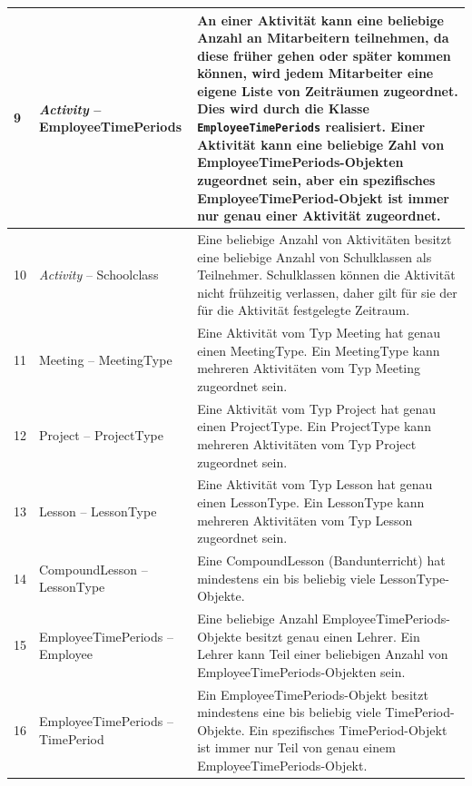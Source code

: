 \documentclass[fontsize=12pt,paper=a4,twoside]{scrartcl}
\begin{document}
\begin{tabularx}{\textwidth}{|p{0.6cm}|p{5cm}|X|}
\hline
9 	& \textit{Activity} -- EmployeeTimePeriods		& An einer Aktivität kann eine beliebige
	Anzahl an Mitarbeitern teilnehmen, da diese früher gehen oder später kommen können, wird jedem Mitarbeiter eine eigene Liste von Zeiträumen zugeordnet. Dies wird durch die Klasse \texttt{EmployeeTimePeriods} realisiert. Einer Aktivität kann eine beliebige Zahl von EmployeeTimePeriods-Objekten zugeordnet sein, aber ein spezifisches EmployeeTimePeriod-Objekt ist immer nur genau einer Aktivität zugeordnet. \\\hline
10	& \textit{Activity} -- Schoolclass				& Eine beliebige Anzahl von Aktivitäten
	besitzt eine beliebige Anzahl von Schulklassen als Teilnehmer. Schulklassen können die Aktivität nicht
	frühzeitig verlassen, daher gilt für sie der für die Aktivität festgelegte Zeitraum.\\\hline
11	& Meeting -- MeetingType 			 & Eine Aktivität vom Typ Meeting hat genau einen
	MeetingType. Ein MeetingType kann mehreren Aktivitäten vom Typ Meeting zugeordnet sein. \\\hline
12	& Project -- ProjectType			& Eine Aktivität vom Typ Project hat genau einen
	ProjectType. Ein ProjectType kann mehreren Aktivitäten vom Typ Project zugeordnet sein. \\\hline
13	& Lesson -- LessonType				& Eine Aktivität vom Typ Lesson hat genau einen
	LessonType. Ein LessonType kann mehreren Aktivitäten vom Typ Lesson zugeordnet sein. \\\hline
14	& CompoundLesson -- LessonType & Eine CompoundLesson (Bandunterricht) hat mindestens ein bis 
	beliebig viele LessonType-Objekte. \\\hline
15 	& EmployeeTimePeriods -- Employee 				& Eine beliebige Anzahl
	EmployeeTimePeriods-Objekte besitzt genau einen Lehrer. Ein Lehrer kann Teil einer beliebigen Anzahl von EmployeeTimePeriods-Objekten sein. \\\hline
16	& EmployeeTimePeriods -- TimePeriod 			& Ein EmployeeTimePeriods-Objekt besitzt
	mindestens eine bis beliebig viele TimePeriod-Objekte. Ein spezifisches TimePeriod-Objekt ist immer nur Teil von genau einem EmployeeTimePeriods-Objekt. \\\hline
\end{tabularx}
\end{document}
